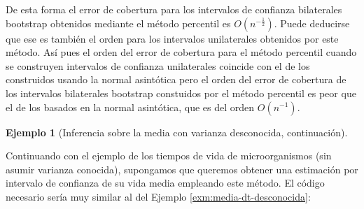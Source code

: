 \documentclass[
]{book}
\theoremstyle{break}
\theoremstyle{definition}
\theoremstyle{definition}
\newtheorem{example}{Ejemplo}[chapter]
\theoremstyle{definition}
\theoremstyle{definition}
\theoremstyle{remark}
\begin{document}
De esta forma el error de cobertura para los intervalos de confianza
bilaterales bootstrap obtenidos mediante el método percentil es \(O\left( n^{-\frac{1}{2}} \right)\). Puede deducirse que ese es también el orden
para los intervalos unilaterales obtenidos por este método. Así pues el
orden del error de cobertura para el método percentil cuando se
construyen intervalos de confianza unilaterales coincide con el de los
construidos usando la normal asintótica pero el orden del error de
cobertura de los intervalos bilaterales bootstrap constuidos por el
método percentil es peor que el de los basados en la normal asintótica,
que es del orden \(O\left( n^{-1} \right)\).

\begin{example}[Inferencia sobre la media con varianza desconocida, continuación]
\protect\hypertarget{exm:media-dt-desconocida-perc}{}{\label{exm:media-dt-desconocida-perc} \iffalse (Inferencia sobre la media con varianza desconocida, continuación) \fi{} } \vspace{0.5cm}

Continuando con el ejemplo de los tiempos de vida de microorganismos
(sin asumir varianza conocida),
supongamos que queremos obtener una estimación por intervalo de confianza
de su vida media empleando este método.
El código necesario sería muy similar al del Ejemplo \ref{exm:media-dt-desconocida}:
\end{example}
\end{document}

